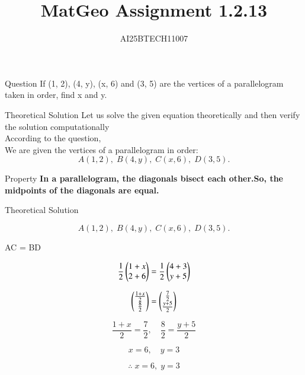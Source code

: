 \documentclass{beamer}
\title 
{MatGeo Assignment 1.2.13}
\author
{AI25BTECH11007}
\begin{document}
\frame{\titlepage}
\begin{frame}{Question}
If (1, 2), (4, y), (x, 6) and (3, 5) are the vertices of a parallelogram taken in order, find
x and y.\\
\end{frame}
\begin{frame}{Theoretical Solution}
\noindent
Let us solve the given equation theoretically and then verify the solution computationally \\
According to the question, \\

We are given the vertices of a parallelogram in order:
$$A(1,2), \; B(4,y), \; C(x,6), \; D(3,5).$$
\end{frame}

\begin{frame}{Property}
\textbf{In a parallelogram, the diagonals bisect each other.So, the midpoints of the diagonals are equal.}
\end{frame}
\begin{frame}{Theoretical Solution}

$$A(1,2), \; B(4,y), \; C(x,6), \; D(3,5).$$

 AC =  BD

\begin{equation}
\frac{1}{2}
\myvec{
1 + x \\
2 + 6
}
=
\frac{1}{2}
\myvec{
4 + 3 \\
y + 5
}
\end{equation}

\begin{equation}
\myvec{
\frac{1+x}{2} \\
\frac{8}{2}
}
=
\myvec{
\frac{7}{2} \\
\frac{y+5}{2}
}
\end{equation}

\begin{equation}
\frac{1+x}{2} = \frac{7}{2}, 
\quad 
\frac{8}{2} = \frac{y+5}{2}
\end{equation}

\begin{equation}
x = 6, 
\quad 
y = 3
\end{equation}

\begin{equation}
\therefore \; x=6, \; y=3
\end{equation}
\end{frame}
\end{document}
